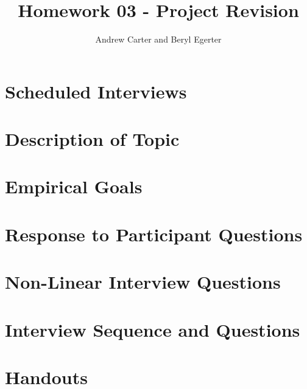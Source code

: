 \documentclass{article}
\title{Homework 03 - Project Revision}
\author{Andrew Carter and Beryl Egerter}
\begin{document}
\maketitle
\section{Scheduled Interviews}

\section{Description of Topic}

\section{Empirical Goals}

\section{Response to Participant Questions}

\section{Non-Linear Interview Questions}

\section{Interview Sequence and Questions}

\section{Handouts}
\end{document}
